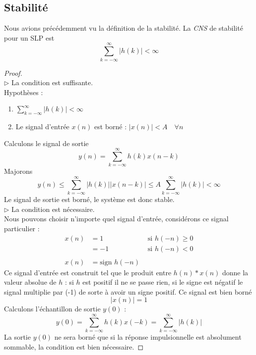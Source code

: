 	\subsection{Stabilité}
	Nous avions précédemment vu la définition de la stabilité. La \textit{CNS} de stabilité 
	pour un SLP est
	\begin{equation}
	\sum_{k=-\infty}^\infty |h(k)|<\infty
	\end{equation}
\newpage
	\begin{proof}\ \\
	$\triangleright$ La condition est suffisante.\\
	Hypothèses :
	\begin{enumerate}
	\item $\sum_{k=-\infty}^\infty |h(k)|<\infty$
	\item Le signal d'entrée $x(n)$ est borné : $|x(n)| < A\quad \forall n$
	\end{enumerate}	 
	Calculons le signal de sortie
	\begin{equation}
	y(n) = \sum_{k=-\infty}^\infty h(k)x(n-k)
	\end{equation}
	Majorons
	\begin{equation}
	y(n) \leq \sum_{k=-\infty}^\infty |h(k)||x(n-k)|\leq A\sum_{k=-\infty}^\infty|h(k)|<\infty
	\end{equation}
	Le signal de sortie est borné, le système est donc stable.\\
	
	$\triangleright$ La condition est nécessaire.\\
	Nous pouvons choisir n'importe quel signal d'entrée, considérons ce signal particulier :
	\begin{equation}
	\begin{array}{lll}
	x(n) &= 1 &\text{ si } h(-n) \geq 0\\
	&= -1 &\text{ si } h(-n) < 0\\
	& \\
	x(n) &= \text{sign }h(-n)
	\end{array}
	\end{equation}
	Ce signal d'entrée est construit tel que le produit entre $h(n)*x(n)$ donne la valeur 
	absolue de $h$ : si $h$ est positif il ne se passe rien, si le signe est négatif le 
	signal multiplie par (-1) de sorte à avoir un signe positif. Ce signal est bien borné
	\begin{equation}
	|x(n)| = 1
	\end{equation}
	Calculons l'échantillon de sortie $y(0)$ :
	\begin{equation}
	y(0) = \sum_{k=-\infty}^\infty h(k)x(-k) = \sum_{k=-\infty}^\infty |h(k)|
	\end{equation}
	La sortie $y(0)$ ne sera borné que si la réponse impulsionnelle est absolument sommable, 
	la condition est bien nécessaire.	
	\end{proof}		
	
